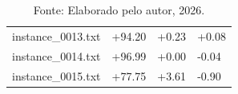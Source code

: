 \begin{table}[H]
\begin{minipage}{\textwidth}
{\begin{tabular}{l | l | l | l}
        instance\_0013.txt & \textcolor{green!50!black}{+94.20} & \textcolor{green!50!black}{+0.23} & \textcolor{green!50!black}{+0.08} \\
        \rowcolor{gray!20} instance\_0014.txt & \textcolor{green!50!black}{+96.99} & +0.00 & \textcolor{red!80!black}{-0.04} \\
        instance\_0015.txt & \textcolor{green!50!black}{+77.75} & \textcolor{green!50!black}{+3.61} & \textcolor{red!80!black}{-0.90} \\
        \hline
      \end{tabular}
    }
    \caption*{\footnotesize Fonte: Elaborado pelo autor, 2026.}
  \end{minipage}
\end{table}
